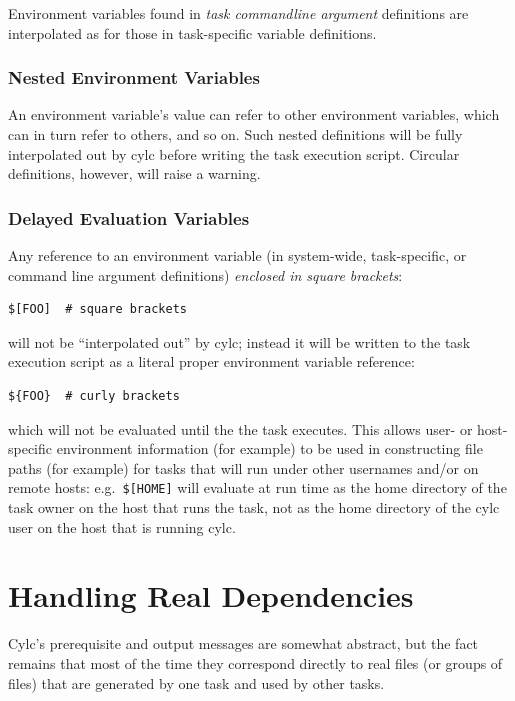 \documentclass[11pt,a4paper]{article}
\begin{document}
Environment variables found in {\em task commandline argument}
definitions are interpolated as for those in task-specific variable
definitions.

\subsubsection{Nested Environment Variables}

An environment variable's value can refer to other environment
variables, which can in turn refer to others, and so on. Such nested
definitions will be fully interpolated out by cylc before writing the 
task execution script.  Circular definitions, however, will raise a
warning.

\subsubsection{Delayed Evaluation Variables}
\label{DelayedEvaluationVariables}

Any reference to an environment variable (in system-wide, task-specific,
or command line argument definitions) {\em enclosed in square brackets}:

\begin{lstlisting}
$[FOO]  # square brackets
\end{lstlisting}

will not be ``interpolated out'' by cylc; instead it will be written to
the task execution script as a literal proper environment variable
reference:

\begin{lstlisting}
${FOO}  # curly brackets
\end{lstlisting}

which will not be evaluated until the the task executes. This allows
user- or host-specific environment information (for example) to
be used in constructing file paths (for example) for tasks that will run
under other usernames and/or on remote hosts: e.g.\ \lstinline=$[HOME]=
will evaluate at run time as the home directory of the task owner on the
host that runs the task, not as the home directory of the cylc user on
the host that is running cylc.

\pagebreak
\section{Handling Real Dependencies}
\label{HandlingRealDependencies}

Cylc's prerequisite and output messages are somewhat abstract, but the
fact remains that most of the time they correspond directly to real 
files (or groups of files) that are generated by one task and used by
other tasks.
\end{document}
